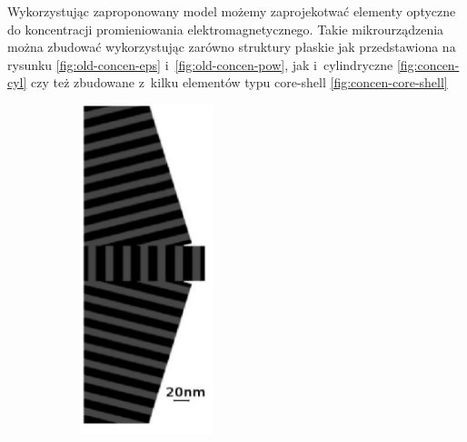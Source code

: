 Wykorzystując zaproponowany model możemy zaprojekotwać elementy optyczne do koncentracji promieniowania elektromagnetycznego. Takie mikrourządzenia można zbudować wykorzystując zarówno struktury płaskie jak przedstawiona na rysunku \ref{fig:old-concen-eps} i~\ref{fig:old-concen-pow}, jak i~cylindryczne \ref{fig:concen-cyl} czy też zbudowane z~kilku elementów typu core-shell \ref{fig:concen-core-shell}
\begin{figure}[!htb]
	\centering
	\begin{subfigure}[b]{.45\textwidth}
		\includegraphics[angle=90,width=\textwidth]{images/multilayer/konc_eps_mgr.png}

\end{subfigure}
\end{figure}
